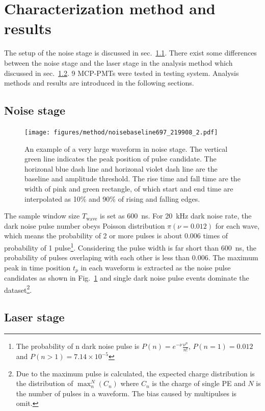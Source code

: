 \section{Characterization method and results}
\label{Method}
The setup of the noise stage is discussed in sec.~\ref{sec:noisestage}. There exist some differences between the noise stage and the laser stage in the analysis method which discussed in sec.~\ref{sec:laserstage}. 9 MCP-PMTs were tested in testing system. Analysis methods and results are introduced in the following sections.
\subsection{Noise stage}
\label{sec:noisestage}
\begin{figure}[!htbp]
    \centering
    \texttt{[image: figures/method/noisebaseline697\_219908\_2.pdf]}
    \caption{An example of a very large waveform in noise stage. The vertical green line indicates the peak position of pulse candidate. The horizonal blue dash line and horizonal violet dash line are the baseline and amplitude threshold. The rise time and fall time are the width of pink and green rectangle, of which start and end time are interpolated as 10\% and 90\% of rising and falling edges.}
    \label{fig:baseline1}
\end{figure}

The sample window size $T_{\mathrm{wave}}$ is set as \SI{600}{ns}. For \SI{20}{kHz} dark noise rate, the dark noise pulse number obeys Poisson distribution $\pi(\nu=0.012)$ for each wave, which means the probability of 2 or more pulses is about 0.006 times of probability of 1 pulse\footnote{The probability of n dark noise pulse is $P(n)=e^{-\nu}\frac{\nu^n}{n!}$, $P(n=1)=0.012$ and $P(n>1)=7.14\times10^{-5}$}. Considering the pulse width is far short than \SI{600}{ns}, the probability of pulses overlaping with each other is less than 0.006. The maximum peak in time position $t_p$ in each waveform is extracted as the noise pulse candidates as shown in Fig.~\ref{fig:baseline1} and single dark noise pulse events dominate the dataset\footnote{Due to the maximum pulse is calculated, the expected charge distribution is the distribution of $\max_n^N(C_n)$ where $C_n$ is the charge of single PE and $N$ is the number of pulses in a waveform. The bias caused by multipulses is omit.}.


\subsection{Laser stage}
\label{sec:laserstage}

